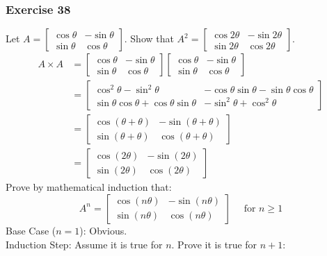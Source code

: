 \documentclass[letterpaper, 12pt]{math}
\begin{document}
\subsubsection*{Exercise 38}
Let \( A = \begin{bmatrix}\cos\theta & -\sin\theta \\ \sin\theta & \cos\theta
\end{bmatrix} \). Show that \( A^2 = \begin{bmatrix}\cos2\theta & -\sin2\theta
\\ \sin2\theta & \cos2\theta\end{bmatrix} \).
\begin{align*}
  A\times A &= \begin{bmatrix}
    \cos\theta & -\sin\theta \\
    \sin\theta & \cos\theta
  \end{bmatrix}\begin{bmatrix}
    \cos\theta & -\sin\theta \\
    \sin\theta & \cos\theta
  \end{bmatrix} \\
  &= \begin{bmatrix}
    \cos^2\theta-\sin^2\theta & -\cos\theta\sin\theta-\sin\theta\cos\theta \\
    \sin\theta\cos\theta+\cos\theta\sin\theta & -\sin^2\theta+\cos^2\theta
  \end{bmatrix} \\
  &= \begin{bmatrix}
    \cos(\theta+\theta) & -\sin(\theta+\theta) \\
    \sin(\theta+\theta) & \cos(\theta+\theta)
  \end{bmatrix} \\
  &= \begin{bmatrix}
    \cos(2\theta) & -\sin(2\theta) \\
    \sin(2\theta) & \cos(2\theta)
  \end{bmatrix}
\end{align*}
Prove by mathematical induction that:
\[ A^n = \begin{bmatrix}
  \cos(n\theta) & -\sin(n\theta) \\
  \sin(n\theta) & \cos(n\theta)
\end{bmatrix} \quad \text{ for } n\ge 1 \]
Base Case (\( n = 1 \)): Obvious. \\
Induction Step: Assume it is true for \( n \). Prove it is true for \( n+1 \):
\end{document}
